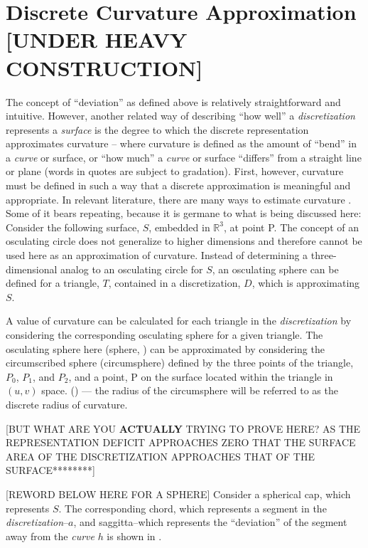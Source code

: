 \section{Discrete Curvature Approximation [UNDER HEAVY CONSTRUCTION]}
The concept of ``deviation'' as defined above is relatively
straightforward and intuitive. However, another related way of
describing ``how well'' a \textit{discretization} represents a
\textit{surface} is the degree to which the discrete representation
approximates curvature -- where curvature is defined as the amount of
``bend'' in a \textit{curve} or surface, or ``how much'' a
\textit{curve} or surface ``differs'' from a straight line or plane
(words in quotes are subject to gradation). First, however, curvature
must be defined in such a way that a discrete approximation is
meaningful and appropriate. In relevant literature, there are many ways
to estimate curvature \cite{hermann07}. Some of it bears repeating,
because it is germane to what is being discussed here: Consider the
following surface, $S$, embedded in ${\mathbb R}^3$, at point P. The
concept of an osculating circle does not generalize to higher dimensions
and therefore cannot be used here as an approximation of curvature.
Instead of determining a three-dimensional analog to an osculating
circle for $S$, an osculating sphere can be defined for a triangle, $T$,
contained in a discretization, $D$, which is approximating $S$.

A value of curvature can be calculated for each triangle in the
\textit{discretization} by considering the corresponding osculating
sphere for a given triangle. The osculating sphere here (sphere,
) can be approximated by considering the
circumscribed sphere (circumsphere) \cite{casey1888} defined by the
three points of the triangle, $P_0$, $P_1$, and $P_2$, and a point, P on
the surface located within the triangle in $(u,v)$ space.
() --- the radius of the circumsphere will
be referred to as the discrete radius of curvature.  


[BUT WHAT ARE YOU {\bf ACTUALLY} TRYING TO PROVE HERE? AS THE REPRESENTATION DEFICIT APPROACHES ZERO THAT THE SURFACE AREA OF THE DISCRETIZATION APPROACHES THAT OF THE SURFACE********]

[REWORD BELOW HERE FOR A SPHERE]
Consider a spherical cap, which represents $S$.
The corresponding chord, which represents a segment in the
\textit{discretization}--$a$, and saggitta--which represents the
``deviation'' of the segment away from the \textit{curve} $h$ is shown
in .  

